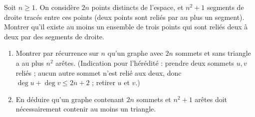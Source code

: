 Soit $n \geq 1$. On considère $2n$ points distincts de l'espace, et $n^2 + 1$
segments de droite tracés entre ces points (deux points sont reliés par au
plus un segment). Montrer qu'il existe au moins un ensemble de
trois points qui sont reliés deux à deux par des segments de droite.
\begin{enumerate}
  \item Montrer par récurrence sur $n$ qu'un graphe avec $2n$ sommets et sans
  triangle a au plus $n^2$ arêtes. (Indication pour l'hérédité : prendre deux
  sommets $u, v$ reliés ; aucun autre sommet n'est relié aux deux, donc
  $\deg u + \deg v \leq 2n+2$ ; retirer $u$ et $v$.)
  \item En déduire qu'un graphe contenant $2n$ sommets et $n^2 + 1$ arêtes
  doit nécessairement contenir au moins un triangle.
\end{enumerate}

